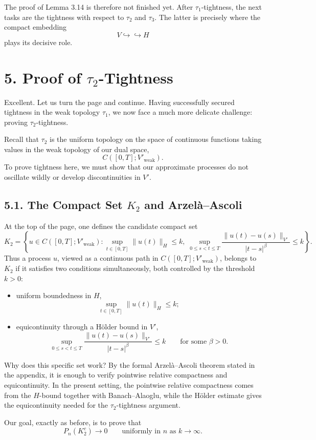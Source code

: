 \documentclass[11pt]{article}
\theoremstyle{definition}
\theoremstyle{remark}
\begin{document}
The proof of Lemma 3.14 is therefore not finished yet. After $\tau_1$-tightness, the next tasks are the tightness with respect to $\tau_2$ and $\tau_3$. The latter is precisely where the compact embedding
\[
  V\hookrightarrow\hookrightarrow H
\]
plays its decisive role.

\section*{5. Proof of $\tau_2$-Tightness}
Excellent. Let us turn the page and continue. Having successfully secured tightness in the weak topology $\tau_1$, we now face a much more delicate challenge: proving $\tau_2$-tightness.

Recall that $\tau_2$ is the uniform topology on the space of continuous functions taking values in the weak topology of our dual space,
\[
  C([0,T];V'_{\mathrm{weak}}).
\]
To prove tightness here, we must show that our approximate processes do not oscillate wildly or develop discontinuities in $V'$.

\subsection*{5.1. The Compact Set $K_2$ and Arzel\`a--Ascoli}
At the top of the page, one defines the candidate compact set
\[
  K_2
  =
  \left\{
    u\in C([0,T];V'_{\mathrm{weak}})
    :
    \sup_{t\in[0,T]}\|u(t)\|_H\le k,\;
    \sup_{0\le s<t\le T}\frac{\|u(t)-u(s)\|_{V'}}{|t-s|^\beta}\le k
  \right\}.
\]
Thus a process $u$, viewed as a continuous path in $C([0,T];V'_{\mathrm{weak}})$, belongs to $K_2$ if it satisfies two conditions simultaneously, both controlled by the threshold $k>0$:
\begin{itemize}
\item uniform boundedness in $H$,
\[
  \sup_{t\in[0,T]}\|u(t)\|_H\le k;
\]
\item equicontinuity through a H\"older bound in $V'$,
\[
  \sup_{0\le s<t\le T}
  \frac{\|u(t)-u(s)\|_{V'}}{|t-s|^\beta}\le k
  \qquad \text{for some } \beta>0.
\]
\end{itemize}
Why does this specific set work? By the formal Arzel\`a--Ascoli theorem stated in the appendix, it is enough to verify pointwise relative compactness and equicontinuity. In the present setting, the pointwise relative compactness comes from the $H$-bound together with Banach--Alaoglu, while the H\"older estimate gives the equicontinuity needed for the $\tau_2$-tightness argument.

Our goal, exactly as before, is to prove that
\[
  P_n(K_2^c)\to 0
  \qquad \text{uniformly in } n \text{ as } k\to\infty.
\]
\end{document}
